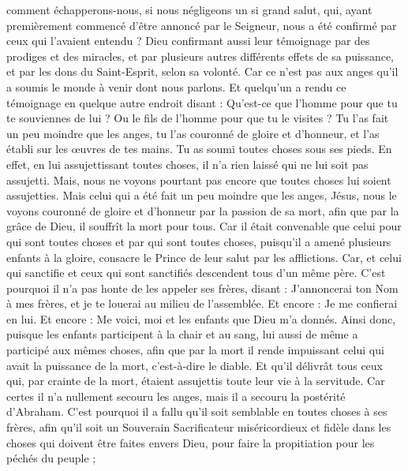 \begin{multicols}{2}
comment échapperons-nous, si nous négligeons un si grand salut, qui, ayant premièrement commencé d’être annoncé par le Seigneur, nous a été confirmé par ceux qui l’avaient entendu ?
Dieu confirmant aussi leur témoignage par des prodiges et des miracles, et par plusieurs autres différents effets de sa puissance, et par les dons du Saint-Esprit, selon sa volonté.
Car ce n'est pas aux anges qu'il a soumis le monde à venir dont nous parlons.
Et quelqu’un a rendu ce témoignage en quelque autre endroit disant : Qu'est-ce que l'homme pour que tu te souviennes de lui ? Ou le fils de l'homme pour que tu le visites ?
Tu l’as fait un peu moindre que les anges, tu l’as couronné de gloire et d’honneur, et l’as établi sur les œuvres de tes mains.
Tu as soumi toutes choses sous ses pieds. En effet, en lui assujettissant toutes choses, il n'a rien laissé qui ne lui soit pas assujetti. Mais, nous ne voyons pourtant pas encore que toutes choses lui soient assujetties.
Mais celui qui a été fait un peu moindre que les anges, Jésus, nous le voyons couronné de gloire et d'honneur par la passion de sa mort, afin que par la grâce de Dieu, il souffrît la mort pour tous.
Car il était convenable que celui pour qui sont toutes choses et par qui sont toutes choses, puisqu'il a amené plusieurs enfants à la gloire, consacre le Prince de leur salut par les afflictions.
Car, et celui qui sanctifie et ceux qui sont sanctifiés descendent tous d'un même père. C'est pourquoi il n’a pas honte de les appeler ses frères,
disant : J'annoncerai ton Nom à mes frères, et je te louerai au milieu de l'assemblée.
Et encore : Je me confierai en lui. Et encore : Me voici, moi et les enfants que Dieu m'a donnés.
Ainsi donc, puisque les enfants participent à la chair et au sang, lui aussi de même a participé aux mêmes choses, afin que par la mort il rende impuissant celui qui avait la puissance de la mort, c'est-à-dire le diable.
Et qu'il délivrât tous ceux qui, par crainte de la mort, étaient assujettis toute leur vie à la servitude.
Car certes il n'a nullement secouru les anges, mais il a secouru la postérité d'Abraham.
C’est pourquoi il a fallu qu’il soit semblable en toutes choses à ses frères, afin qu'il soit un Souverain Sacrificateur miséricordieux et fidèle dans les choses qui doivent être faites envers Dieu, pour faire la propitiation pour les péchés du peuple ;

\end{multicols}
